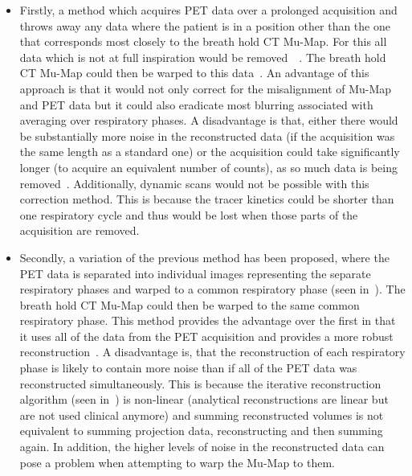             \begin{itemize}
                \item Firstly, a method which acquires \gls{PET} data over a prolonged acquisition and throws away any data where the patient is in a position other than the one that corresponds most closely to the breath hold \gls{CT} \gls{Mu-Map}. For this all data which is not at full inspiration would be removed~~. %
                The breath hold \gls{CT} \gls{Mu-Map} could then be warped to this data~. An advantage of this approach is that it would not only correct for the misalignment of \gls{Mu-Map} and \gls{PET} data but it could also eradicate most blurring associated with averaging over respiratory phases. A disadvantage is that, either there would be substantially more noise in the reconstructed data (if the acquisition was the same length as a standard one) or the acquisition could take significantly longer (to acquire an equivalent number of counts), as so much data is being removed~. Additionally, dynamic scans would not be possible with this correction method. This is because the tracer kinetics could be shorter than one respiratory cycle and thus would be lost when those parts of the acquisition are removed.
                
                \item Secondly, a variation of the previous method has been proposed, where the \gls{PET} data is separated into individual images representing the separate respiratory phases and warped to a common respiratory phase (seen in~). The breath hold \gls{CT} \gls{Mu-Map} could then be warped to the same common respiratory phase. This method provides the advantage over the first in that it uses all of the data from the \gls{PET} acquisition and provides a more robust reconstruction~. A disadvantage is, that the reconstruction of each respiratory phase is likely to contain more noise than if all of the \gls{PET} data was reconstructed simultaneously. This is because the iterative reconstruction algorithm (seen in~) is non-linear (analytical reconstructions are linear but are not used clinical anymore) and summing reconstructed volumes is not equivalent to summing projection data, reconstructing and then summing again. %
                In addition, the higher levels of noise in the reconstructed data can pose a problem when attempting to warp the \gls{Mu-Map} to them.
                

\end{itemize}
